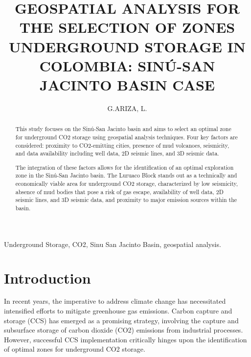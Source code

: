 \documentclass{ifacconf}
\begin{document}
\begin{frontmatter}

\title{GEOSPATIAL ANALYSIS FOR THE SELECTION OF ZONES UNDERGROUND STORAGE IN COLOMBIA: SINÚ-SAN JACINTO BASIN CASE } 




\author[First]{G.ARIZA, L.} 



\address[First]{Universidad Nacional de Colombia, sede Medellin (e-mail: anggarciaar@unal.edu.co).}


\begin{abstract}                %

This study focuses on the Sinú-San Jacinto basin and aims to select an optimal zone for underground CO2 storage using geospatial analysis techniques. Four key factors are considered: proximity to CO2-emitting cities, presence of mud volcanoes, seismicity, and data availability including well data, 2D seismic lines, and 3D seismic data.

The integration of these factors allows for the identification of an optimal exploration zone in the Sinú-San Jacinto basin. The Luruaco Block stands out as a technically and economically viable area for underground CO2 storage, characterized by low seismicity, absence of mud bodies that pose a risk of gas escape, availability of well data, 2D seismic lines, and 3D seismic data, and proximity to major emission sources within the basin.
\end{abstract}

\begin{keyword}
Underground Storage, CO2, Sinu San Jacinto Basin, geospatial analysis.
\end{keyword}

\end{frontmatter}

\section{Introduction}
In recent years, the imperative to address climate change has necessitated intensified efforts to mitigate greenhouse gas emissions. Carbon capture and storage (CCS) has emerged as a promising strategy, involving the capture and subsurface storage of carbon dioxide (CO2) emissions from industrial processes. However, successful CCS implementation critically hinges upon the identification of optimal zones for underground CO2 storage\cite{Chen2015}.
\end{document}
